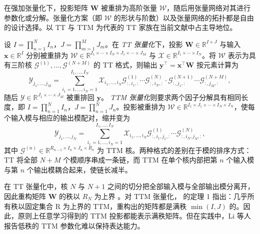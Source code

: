 \documentclass[11pt]{article}
\newcommand{\R}{\mathbb{R}}
\newcommand{\ten}[1]{\mathcal{#1}}
\newcommand{\mat}[1]{\mathbf{#1}}
\newcommand{\vecb}[1]{\mathbf{#1}}
\newcommand{\set}[1]{\mathrm{#1}}
\begin{document}
在强加张量化下，投影矩阵 $\mat{W}$ 被重排为高阶张量 $\ten{W}$，随后用张量网络对其进行参数化或分解。张量化方案（即 $\ten{W}$ 的形状与阶数）以及张量网络的拓扑都是自由的设计选择。以 TT 与 TTM 为代表的 TT 家族在当前文献中占主导地位。


设 $I = \prod_{n=1}^N I_n$，$J = \prod_{m=1}^M J_m$。在 \emph{TT 张量化}下，投影 $\mat{W} \in \R^{I \times J}$ 与输入 $\vecb{x} \in \R^{I}$ 分别被重排为 $\ten{W} \in \R^{I_1 \times \cdots \times I_N \times J_1 \times \cdots \times J_M}$ 与 $\ten{X} \in \R^{I_{1} \times \cdots \times I_{N}}$。将 $\ten{W}$ 表示为具有三阶核 $\ten{G}^{(1)}, \dots, \ten{G}^{(N+M)}$ 的 TT 格式，则输出 $\vecb{y}^\top = \vecb{x}^\top \mat{W}$ 按元素计算为
\begin{equation}
  \ten{Y}_{j_1, \dots, j_M} = \sum_{i_1=1, \dots, i_N=1}^{I_1, \dots, I_N} \ten{X}_{i_1, \dots, i_N} \ten{G}^{(1)}_{:, i_1, :} \cdots \ten{G}^{(N)}_{:, i_N, :} \cdot \ten{G}^{(N+1)}_{:, j_1, :} \cdots \ten{G}^{(N+M)}_{:, j_M, :},
\end{equation}
随后 $\ten{Y} \in \R^{J_1 \times \cdots \times J_M}$ 被重排回 $\vecb{y}$。
\emph{TTM 张量化}则要求两个因子分解具有相同长度，即 $I = \prod_{n=1}^N I_n$，$J = \prod_{n=1}^N J_n$。投影被重排为 $\ten{W} \in \R^{I_1 \times J_1 \times \cdots \times I_N \times J_N}$，使每个输入模与相应的输出模配对，缩并变为
\begin{equation}
  \ten{Y}_{j_1, \dots, j_N} = \sum_{i_1=1, \dots, i_N=1}^{I_1, \dots, I_N} \ten{X}_{i_1, \dots, i_N} \ten{G}^{(1)}_{:, i_1, j_1, :} \cdots \ten{G}^{(N)}_{:, i_N, j_N, :}, 
\end{equation}
其中 $\ten{G}^{(n)} \in \R^{R_{n-1} \times I_n \times J_n \times R_n}$ 为 TTM 核。两种格式的差别在于模的排序方式：TT 将全部 $N+M$ 个模顺序串成一条链，而 TTM 在单个核内部把第 $n$ 个输入模与第 $n$ 个输出模耦合起来，使链长减半。

在 TT 张量化中，核 $N$ 与 $N+1$ 之间的切分把全部输入模与全部输出模分离开，因此重构矩阵 $\mat{W}$ 的秩以 $R_{N}$ 为上界 \cite{oseledets2011tensor}。对 TTM 张量化，\cite{hrinchuk2020tensorized} 的定理 1 指出：几乎所有秩以固定集合 $\set{R}$ 为上界的 TTM，重构出的矩阵都是满秩 $\min(I, J)$ 的。因此，原则上任意学习得到的 TTM 投影都能表示满秩矩阵。但在实践中，Li 等人 \cite{li2022hypoformer} 报告低秩的 TTM 参数化难以保持表达能力。

\end{document}
